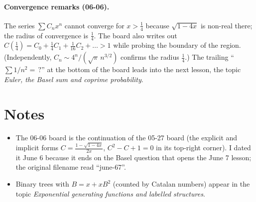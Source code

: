 \documentclass[11pt]{article}
\begin{document}
\paragraph{Convergence remarks (06-06).} The series $\sum C_nx^n$ cannot converge for $x>\tfrac14$ because $\sqrt{1-4x}$ is non-real there; the radius of convergence is $\tfrac14$. The board also writes out $C(\tfrac14)=C_0+\tfrac14C_1+\tfrac1{16}C_2+\dots>1$ while probing the boundary of the region. (Independently, $C_n\sim4^n/(\sqrt\pi\,n^{3/2})$ confirms the radius $\tfrac14$.) The trailing ``$\sum 1/n^2=\,?$'' at the bottom of the board leads into the next lesson, the topic \emph{Euler, the Basel sum and coprime probability}.

\section*{Notes}
\begin{itemize}[nosep]
  \item The 06-06 board is the continuation of the 05-27 board (the explicit and implicit forms $C=\frac{1-\sqrt{1-4x}}{2x}$, $C^2-C+1=0$ in its top-right corner). I dated it June 6 because it ends on the Basel question that opens the June 7 lesson; the original filename read ``june-67''.
  \item Binary trees with $B=x+xB^2$ (counted by Catalan numbers) appear in the topic \emph{Exponential generating functions and labelled structures}.
\end{itemize}
\end{document}
